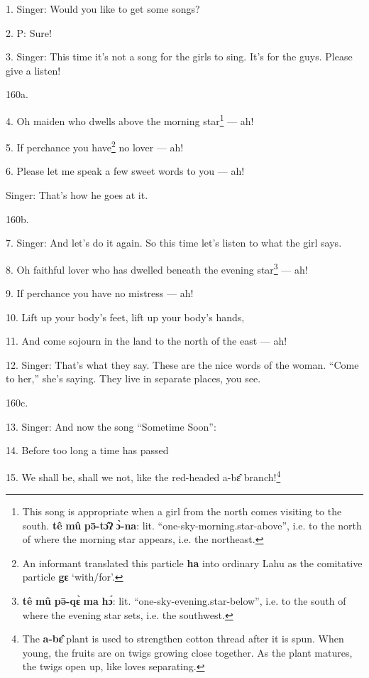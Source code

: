 \setcounter{footnote}{0}

1. Singer: Would you like to get some songs?

2. P: Sure!

3. Singer: This time it's not a song for the girls to sing. It's for the guys. Please
give a listen!

160a.

4. Oh maiden who dwells above the morning star\footnote{This song is appropriate when a girl from the north comes visiting to the south. \textbf{tê} \textbf{mû} \textbf{pə̄-tɔ̂ʔ} \textbf{ɔ̀-na}: lit. ``one-sky-morning.star-above'', i.e. to the north of where the morning star appears, i.e. the northeast.} --- ah!

5. If perchance you have\footnote{An informant translated this particle \textbf{ha} into ordinary Lahu as the comitative particle \textbf{gɛ} `with/for'.} no lover --- ah!

6. Please let me speak a few sweet words to you --- ah!

Singer: That's how he goes at it.

160b.

7. Singer: And let's do it again. So this time let's listen to what the girl says.

8. Oh faithful lover who has dwelled beneath the evening star\footnote{\textbf{tê} \textbf{mû} \textbf{pə̄-qɛ̀} \textbf{ma} \textbf{hɔ́}: lit. ``one-sky-evening.star-below'', i.e. to the south of where the evening star sets, i.e. the southwest.} --- ah!

9. If perchance you have no mistress --- ah!

10. Lift up your body's feet, lift up your body's hands,

11. And come sojourn in the land to the north of the east --- ah!

12. Singer: That's what they say. These are the nice words of the woman. ``Come
to her,'' she's saying. They live in separate places, you see.

160c.

13. Singer: And now the song ``Sometime Soon'':

14. Before too long a time has passed

15. We shall be, shall we not, like the red-headed a-bɛ̂ branch!\footnote{The \textbf{a-bɛ̂} plant is used to strengthen cotton thread after it is spun. When young, the fruits are on twigs growing close together. As the plant matures, the twigs open up, like loves separating.}

